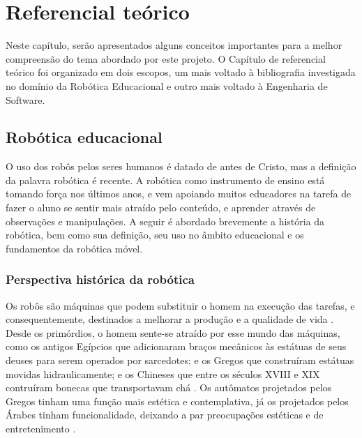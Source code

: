 \chapter{Referencial teórico}
Neste capítulo, serão apresentados alguns conceitos importantes para a melhor compreensão do tema abordado por este projeto. O Capítulo de referencial teórico foi organizado em dois escopos, um mais voltado à bibliografia investigada no domínio da Robótica Educacional e outro mais voltado à Engenharia de Software.
\section{Robótica educacional}
O uso dos robôs pelos seres humanos é datado de antes de Cristo, mas a definição da palavra robótica é recente. A robótica como instrumento de ensino está tomando força nos últimos anos, e vem apoiando muitos educadores na tarefa de fazer o aluno se sentir mais atraído pelo conteúdo, e aprender através de observações e manipulações. A seguir é abordado brevemente a história da robótica, bem como sua definição, seu uso no âmbito educacional e os fundamentos da robótica móvel. 
\subsection{Perspectiva histórica da robótica}
Os robôs são máquinas que podem substituir o homem na execução das tarefas, e consequentemente, destinados a melhorar a produção e a qualidade de vida . Desde os primórdios, o homem sente-se  atraído por esse mundo das máquinas, como os antigos Egípcios que adicionaram braços mecânicos às estátuas de seus deuses para serem operados por sarcedotes; e os Gregos que construíram estátuas movidas hidraulicamente; e os Chineses que entre os séculos XVIII e XIX contruíram bonecas que transportavam chá \cite{santos2002robotica}.
Os autômatos projetados pelos Gregos tinham uma função mais estética e contemplativa, já os projetados pelos Árabes tinham funcionalidade, deixando a par preocupações estéticas e de entretenimento \cite{santos2002robotica}.

